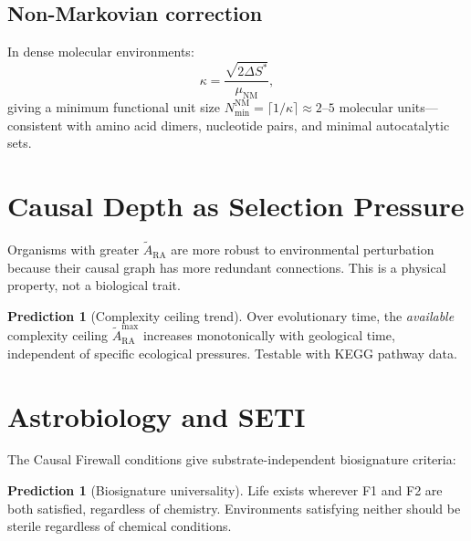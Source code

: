 \documentclass[11pt,a4paper]{article}
\theoremstyle{plain}
\theoremstyle{definition}
\newtheorem{prediction}[theorem]{Prediction}
\theoremstyle{remark}
\begin{document}
\subsection{Non-Markovian correction}\label{sec:nonmarkov}

In dense molecular environments:
\begin{equation}
\kappa = \frac{\sqrt{2\Delta S^*}}{\mu_{\mathrm{NM}}},
\label{eq:kappa}
\end{equation}
giving a minimum functional unit size
$N_{\min}^{\mathrm{NM}} = \lceil 1/\kappa \rceil \approx 2$--$5$ molecular
units---consistent with amino acid dimers, nucleotide pairs, and minimal
autocatalytic sets.

\section{Causal Depth as Selection Pressure}\label{sec:selection}

Organisms with greater $\tilde{A}_{\mathrm{RA}}$ are more robust to environmental
perturbation because their causal graph has more redundant connections.  This is a
physical property, not a biological trait.

\begin{prediction}[Complexity ceiling trend]\label{pred:trend}
Over evolutionary time, the \emph{available} complexity ceiling
$\tilde{A}_{\mathrm{RA}}^{\max}$ increases monotonically with geological time,
independent of specific ecological pressures.  Testable with KEGG pathway data.
\end{prediction}

\section{Astrobiology and SETI}\label{sec:seti}

The Causal Firewall conditions give substrate-independent biosignature criteria:

\begin{prediction}[Biosignature universality]\label{pred:biosig}
Life exists wherever F1 and F2 are both satisfied, regardless of chemistry.
Environments satisfying neither should be sterile regardless of chemical conditions.
\end{prediction}
\end{document}
